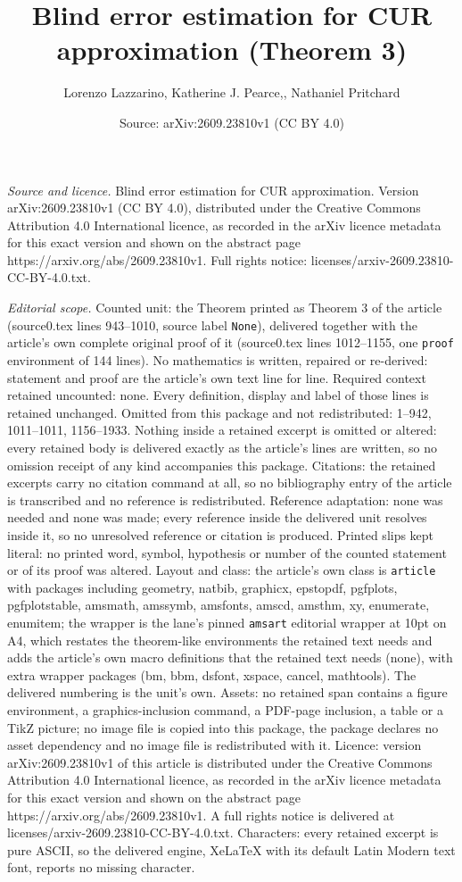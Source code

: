\documentclass[10pt,a4paper]{amsart}
\title[Blind error estimation for CUR approximation]{Blind error estimation for CUR approximation (Theorem 3)}
\author{Lorenzo Lazzarino, Katherine J. Pearce,, Nathaniel Pritchard}
\date{Source: arXiv:2609.23810v1 (CC BY 4.0)}
\begin{document}
\maketitle

\noindent\emph{Source and licence.} Blind error estimation for CUR approximation. Version arXiv:2609.23810v1 (CC BY 4.0), distributed under the Creative Commons Attribution 4.0 International licence, as recorded in the arXiv licence metadata for this exact version and shown on the abstract page https://arxiv.org/abs/2609.23810v1. Full rights notice: licenses/arxiv-2609.23810-CC-BY-4.0.txt.\par\smallskip

\noindent\textit{Editorial scope.} Counted unit: the Theorem printed as Theorem 3 of the article (source0.tex lines 943--1010, source label \texttt{None}), delivered together with the article's own complete original proof of it (source0.tex lines 1012--1155, one \texttt{proof} environment of 144 lines). No mathematics is written, repaired or re-derived: statement and proof are the article's own text line for line. Required context retained uncounted: none. Every definition, display and label of those lines is retained unchanged. Omitted from this package and not redistributed: 1--942, 1011--1011, 1156--1933. Nothing inside a retained excerpt is omitted or altered: every retained body is delivered exactly as the article's lines are written, so no omission receipt of any kind accompanies this package. Citations: the retained excerpts carry no citation command at all, so no bibliography entry of the article is transcribed and no reference is redistributed. Reference adaptation: none was needed and none was made; every reference inside the delivered unit resolves inside it, so no unresolved reference or citation is produced. Printed slips kept literal: no printed word, symbol, hypothesis or number of the counted statement or of its proof was altered. Layout and class: the article's own class is \texttt{article} with packages including geometry, natbib, graphicx, epstopdf, pgfplots, pgfplotstable, amsmath, amssymb, amsfonts, amscd, amsthm, xy, enumerate, enumitem; the wrapper is the lane's pinned \texttt{amsart} editorial wrapper at 10pt on A4, which restates the theorem-like environments the retained text needs and adds the article's own macro definitions that the retained text needs (none), with extra wrapper packages (bm, bbm, dsfont, xspace, cancel, mathtools). The delivered numbering is the unit's own. Assets: no retained span contains a figure environment, a graphics-inclusion command, a PDF-page inclusion, a table or a TikZ picture; no image file is copied into this package, the package declares no asset dependency and no image file is redistributed with it. Licence: version arXiv:2609.23810v1 of this article is distributed under the Creative Commons Attribution 4.0 International licence, as recorded in the arXiv licence metadata for this exact version and shown on the abstract page https://arxiv.org/abs/2609.23810v1. A full rights notice is delivered at licenses/arxiv-2609.23810-CC-BY-4.0.txt. Characters: every retained excerpt is pure ASCII, so the delivered engine, XeLaTeX with its default Latin Modern text font, reports no missing character.
\end{document}
